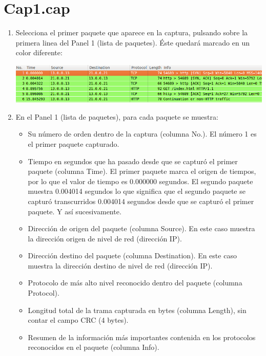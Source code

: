 \documentclass[12pt, a4paper]{report}
\begin{document}
\section{Cap1.cap}
\begin{enumerate}
	\item Selecciona el primer paquete que aparece en la captura, pulsando sobre la primera linea del Panel 1 (lista de paquetes). Éste quedará marcado en un color diferente:
	
	\includegraphics*[width=128mm, scale=0.5, center]{enunciado1}
	\item En el Panel 1 (lista de paquetes), para cada paquete se muestra:
	\begin{itemize}
		\item Su número de orden dentro de la captura (columna No.). El número 1 es el primer paquete capturado.
		\item Tiempo en segundos que ha pasado desde que se capturó el primer paquete (columna Time). El primer
		paquete marca el origen de tiempos, por lo que el valor de tiempo es 0.000000 segundos. El segundo
		paquete muestra 0.004014 segundos lo que significa que el segundo paquete se capturó transcurridos
		0.004014 segundos desde que se capturó el primer paquete. Y así sucesivamente.
		\item Dirección de origen del paquete (columna Source). En este caso muestra la dirección origen de nivel de
		red (dirección IP).
		\item Dirección destino del paquete (columna Destination). En este caso muestra la dirección destino de nivel
		de red (dirección IP).
		\item Protocolo de más alto nivel reconocido dentro del paquete (columna Protocol).
		\item Longitud total de la trama capturada en bytes (columna Length), sin contar el campo CRC (4 bytes).
		\item Resumen de la información más importantes contenida en los protocolos reconocidos en el paquete
		(columna Info).	
	\end{itemize}


\end{enumerate}
\end{document}
